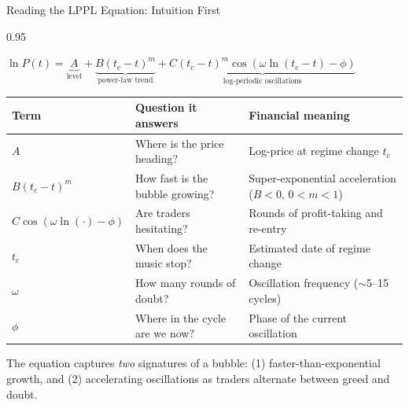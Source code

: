 \documentclass[9pt, aspectratio=169, t]{beamer}
\begin{document}
\begin{frame}{Reading the LPPL Equation: Intuition First}
    \begin{cminipage}{0.95\textwidth}
    {\footnotesize
    \begin{center}
        $\ln P(t) = \underbrace{A}_{\text{level}} + \underbrace{B(t_c - t)^m}_{\text{power-law trend}} + \underbrace{C(t_c - t)^m \cos(\omega \ln(t_c - t) - \phi)}_{\text{log-periodic oscillations}}$
    \end{center}
    \vspace{2mm}
    \renewcommand{\arraystretch}{1.5}
    \begin{tabular}{>{\centering\arraybackslash}p{2.5cm} p{4.2cm} p{4.5cm}}
        \toprule
        \textbf{Term} & \textbf{Question it answers} & \textbf{Financial meaning} \\
        \midrule
        $A$ & Where is the price heading? & Log-price at regime change $t_c$ \\
        $B(t_c - t)^m$ & How fast is the bubble growing? & Super-exponential acceleration ($B < 0$, $0 < m < 1$) \\
        $C\cos(\omega\ln(\cdot) - \phi)$ & Are traders hesitating? & Rounds of profit-taking and re-entry \\
        $t_c$ & When does the music stop? & Estimated date of regime change \\
        $\omega$ & How many rounds of doubt? & Oscillation frequency ($\sim$5--15 cycles) \\
        $\phi$ & Where in the cycle are we now? & Phase of the current oscillation \\
        \bottomrule
    \end{tabular}
    }
    \vspace{2mm}
    {\scriptsize\textcolor{MediumGray}{The equation captures \textit{two} signatures of a bubble: (1) faster-than-exponential growth, and (2) accelerating oscillations as traders alternate between greed and doubt.}}
    \end{cminipage}
\end{frame}
\end{document}

